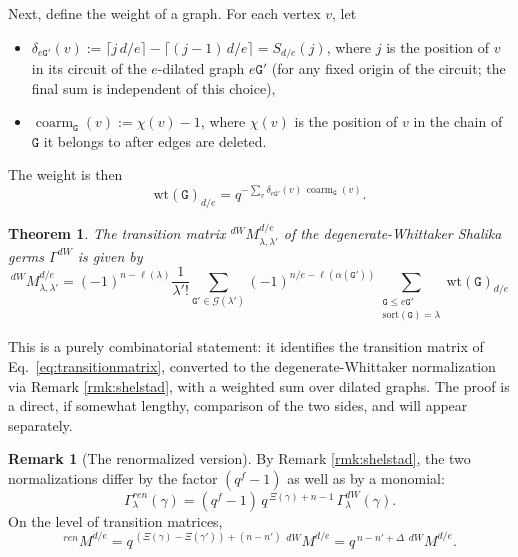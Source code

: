 \documentclass{amsart}
\numberwithin{equation}{section}
\newtheorem{theorem}[lemma]{Theorem}%
\theoremstyle{definition}
\newtheorem{remark}[lemma]{Remark}%
\DeclareMathOperator{\coarm}{\mathrm{coarm}}
\newcommand{\cG}{\mathcal{G}}
\newcommand{\wt}{\mathrm{wt}}
\begin{document}
Next, define the weight of a graph. For each vertex $v$, let
\begin{itemize}
\item[(a)] $\delta_{e\mathtt{G}'}(v):=\lceil j\,d/e\rceil-\lceil (j-1)\,d/e\rceil=S_{d/e}(j)$, where $j$ is the position of $v$ in its circuit of the $e$-dilated graph $e\mathtt{G}'$ (for any fixed origin of the circuit; the final sum is independent of this choice),
\item[(b)] $\coarm_{\mathtt{G}}(v):=\chi(v)-1$, where $\chi(v)$ is the position of $v$ in the chain of $\mathtt{G}$ it belongs to after edges are deleted.
\end{itemize}
The weight is then $$\wt(\mathtt{G})_{d/e}=q^{-\sum_{v}\delta_{e\mathtt{G}'}(v)\,\coarm_{\mathtt{G}}(v)}.$$
\begin{theorem}\label{thm:graphformula}
The transition matrix ${}^{dW}M^{d/e}_{\lambda,\lambda'}$ of the degenerate-Whittaker Shalika germs $\Gamma^{dW}$ is given by
\begin{equation}
\label{eq:transitionmatrix2}
{}^{dW}M_{\lambda,\lambda'}^{d/e}=(-1)^{n-\ell(\lambda)}\frac{1}{\lambda'!}\sum_{\mathtt{G}'\in\cG(\lambda')} (-1)^{n/e-\ell(\alpha(\mathtt{G'}))}\sum_{\substack{\mathtt{G}\leq e\mathtt{G}'\\ \mathrm{sort}(\mathtt{G})=\lambda}}\wt(\mathtt{G})_{d/e}
\end{equation}
\end{theorem}
This is a purely combinatorial statement: it identifies the transition matrix of Eq.~\eqref{eq:transitionmatrix}, converted to the degenerate-Whittaker normalization via Remark \ref{rmk:shelstad}, with a weighted sum over dilated graphs. The proof is a direct, if somewhat lengthy, comparison of the two sides, and will appear separately.


\begin{remark}[The renormalized version]\label{rmk:rengraph}
By Remark \ref{rmk:shelstad}, the two normalizations differ by the factor $(q^f-1)$ as well as by a monomial:
$$\Gamma^{ren}_\lambda(\gamma)=(q^f-1)\,q^{\,\Xi(\gamma)+n-1}\,\Gamma^{dW}_\lambda(\gamma).$$
On the level of transition matrices,
$${}^{ren}M^{d/e}=q^{\,(\Xi(\gamma)-\Xi(\gamma'))+(n-n')}\;{}^{dW}\!M^{d/e}=q^{\,n-n'+\Delta}\;{}^{dW}\!M^{d/e}.$$
\end{remark}
\end{document}
